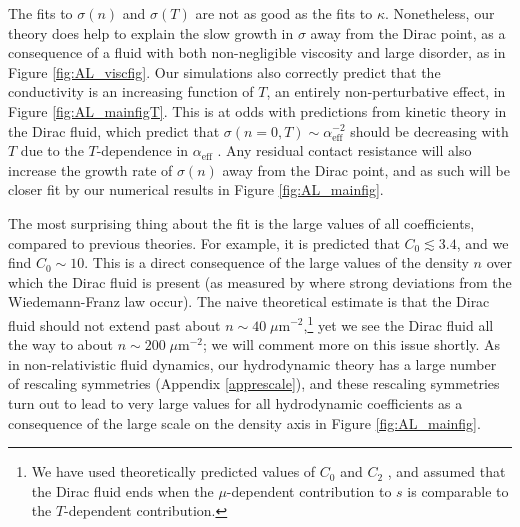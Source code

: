 The fits to $\sigma(n)$ and $\sigma(T)$ are not as good as the fits to $\kappa$.  Nonetheless, our theory does help to explain the slow growth in $\sigma$ away from the Dirac point, as a consequence of a fluid with both non-negligible viscosity and large disorder, as in Figure \ref{fig:AL_viscfig}.   Our simulations also correctly predict that the conductivity is an increasing function of $T$,  an entirely non-perturbative effect, in Figure \ref{fig:AL_mainfigT}.   This is at odds with predictions from kinetic theory in the Dirac fluid, which predict that $\sigma(n=0,T) \sim \alpha^{-2}_{\mathrm{eff}}$ should be decreasing with $T$ due to the $T$-dependence in $\alpha_{\mathrm{eff}}$ \cite{muller_quantum-critical_2008}.   Any residual contact resistance \cite{wang_one-dimensional_2013} will also increase the growth rate of $\sigma(n)$ away from the Dirac point, and as such will be closer fit by our numerical results in Figure \ref{fig:AL_mainfig}.


The most surprising thing about the fit is the  large values of all coefficients, compared to previous theories.   For example, it is predicted \cite{vafek_anomalous_2007, sheehy_quantum_2007} that $C_0 \lesssim 3.4$, and we find $C_0 \sim 10$.   This is a direct consequence of the large values of the density $n$ over which the Dirac fluid is present (as measured by where strong deviations from the Wiedemann-Franz law occur).  The naive theoretical estimate is that the Dirac fluid should not extend past about $n\sim 40 \; \mu \mathrm{m}^{-2}$,\footnote{We have used theoretically predicted values of $C_0$ and $C_2$ \cite{sheehy_quantum_2007}, and assumed that the Dirac fluid ends when the $\mu$-dependent contribution to $s$ is comparable to the $T$-dependent contribution.} yet we see the Dirac fluid all the way to about $n\sim 200 \; \mu\mathrm{m}^{-2}$; we will comment more on this issue shortly.    As in non-relativistic fluid dynamics, our hydrodynamic theory has a large number of rescaling symmetries (Appendix \ref{apprescale}), and these rescaling symmetries turn out to lead to very large values for all hydrodynamic coefficients as a consequence of the large scale on the density axis in Figure \ref{fig:AL_mainfig}.

